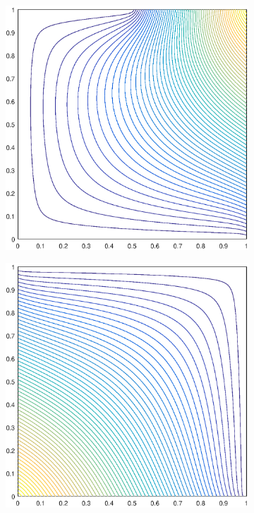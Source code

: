 \begin{figure}
\begin{subfigure}[b]{0.35\textwidth}
		\caption{}
	\end{subfigure}
	\hspace{1cm}
	\begin{subfigure}[b]{0.35\textwidth}
		\centering
		\includegraphics[width=\textwidth]{figures/sec_BF/deg_square_MV1_contour_b3.eps}
		\caption{}
	\end{subfigure}
	\vfill
	\begin{subfigure}[b]{0.35\textwidth}
		\centering
		\includegraphics[width=\textwidth]{figures/sec_BF/deg_square_MV1_contour_b1.eps}

\end{subfigure}
\end{figure}
